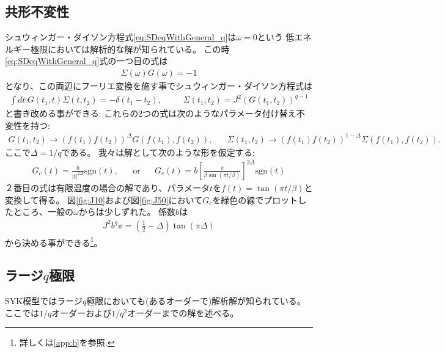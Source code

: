 \subsection{共形不変性}
シュウィンガー・ダイソン方程式\eqref{eq:SDeqWithGeneral_q}は$\omega = 0$という
低エネルギー極限においては解析的な解が知られている。
この時\eqref{eq:SDeqWithGeneral_q}式の一つ目の式は
\begin{align}
	\Sigma(\omega)G(\omega) = -1
\end{align}
となり、この両辺にフーリエ変換を施す事でシュウィンガー・ダイソン方程式は
\begin{align}
	\int dt\ G(t_1, t)\Sigma(t, t_2) = -\delta(t_1 - t_2),
	\hspace{30pt}
	\Sigma(t_1, t_2) = J^2 (G(t_1, t_2))^{q-1}
	\label{eq:conformalSD}
\end{align}
と書き改める事ができる.
これらの2つの式は次のようなパラメータ付け替え不変性を持つ:
\begin{align}
	G(t_1, t_2) \to (f(t_1)f(t_2))^{\Delta}G(f(t_1),f(t_2)),
	\hspace{20pt}
	\Sigma(t_1, t_2) \to (f(t_1)f(t_2))^{1 - \Delta}\Sigma(f(t_1),f(t_2)).
\end{align}
ここで$\Delta = 1 / q$である。
我々は解として次のような形を仮定する:
\begin{align}
	G_c(t) = \frac{b}{|t|^{2\Delta}}\mathrm{sgn}(t),
	\hspace{20pt}
	\mathrm{or}
	\hspace{20pt}
	G_c(t) = b\left[\frac{\pi}{\beta\sin(\pi t / \beta)}\right]^{2\Delta}\mathrm{sgn}(t)
	\label{eq:conformal_ansatz}
\end{align}
２番目の式は有限温度の場合の解であり、パラメータ$t$を$f(t) = \tan(\pi t / \beta)$と変換して得る。
図\ref{fig:J10}および図\ref{fig:J50}において$G_c$を緑色の線でプロットしたところ、一般の$\omega$からは少しずれた。
係数$b$は
\begin{align}
	J^2 b^q \pi = \left(\frac{1}{2} - \Delta \right)\tan(\pi \Delta)
\end{align}
から決める事ができる\footnote{詳しくは\ref{app:b}を参照.}。

\subsection{ラージ$q$極限}
SYK模型ではラージ$q$極限においても(あるオーダーで)解析解が知られている。
ここでは$1/q$オーダーおよび$1/q^2$オーダーまでの解を述べる。

